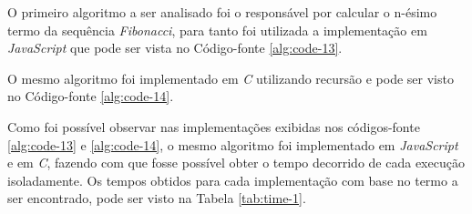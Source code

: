 O primeiro algoritmo a ser analisado foi o responsável por calcular o n-ésimo termo da
sequência \textit{Fibonacci}, para tanto foi utilizada a implementação em
\textit{JavaScript} que pode ser vista no Código-fonte \ref{alg:code-13}.



O mesmo algoritmo foi implementado em \textit{C} utilizando recursão e pode ser visto no
Código-fonte \ref{alg:code-14}.



Como foi possível observar nas implementações exibidas nos códigos-fonte \ref{alg:code-13}
e \ref{alg:code-14}, o mesmo algoritmo foi implementado em \textit{JavaScript} e em
\textit{C}, fazendo com que fosse possível obter o tempo decorrido de cada execução
isoladamente. Os tempos obtidos para cada implementação com base no termo a ser
encontrado, pode ser visto na Tabela \ref{tab:time-1}.

\begin{table}[ht]
\end{table}

